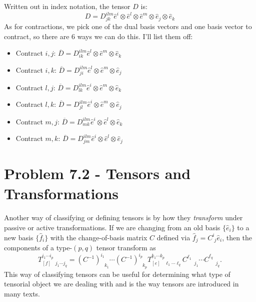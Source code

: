 \documentclass{article}
\newcommand{\pascovar}[2]{C^{#1}_{\phantom{#1}#2}}					%
\newcommand{\pascontra}[2]{(C^{-1})^{#1}_{\phantom{#1}#2}}				%
\begin{document}
\begin{solution}
	Written out in index notation, the tensor $D$ is:
	\[
		D = D^{ilm}_{jk} \hat{e}^i \otimes \hat{e}^l \otimes \hat{e}^m \otimes \hat{e}_j \otimes \hat{e}_k
	\] 
	As for contractions, we pick one of the dual basis vectors and one basis vector to contract, so there are 
	6 ways we can do this. I'll list them off:
	\begin{itemize}
		\item Contract $i, j$: $\overline D = D^{ilm}_{ik} \hat{e}^l \otimes \hat{e}^m \otimes \hat{e}_k$
		\item Contract $i, k$: $\overline D = D^{ilm}_{ji} \hat{e}^l \otimes \hat{e}^m \otimes \hat{e}_j$
		\item Contract $l, j$: $\overline D = D^{ilm}_{lk} \hat{e}^i \otimes \hat{e}^m \otimes \hat{e}_k$
		\item Contract $l, k$: $\overline D = D^{ilm}_{jl} \hat{e}^i \otimes \hat{e}^m \otimes \hat{e}_j $
		\item Contract $m, j$: $\overline D = D^{ilm}_{m k} \hat{e}^i \otimes \hat{e}^l \otimes \hat{e}_k$
		\item Contract $m, k$: $\overline D = D^{ilm}_{jm} \hat{e}^i \otimes \hat{e}^l \otimes \hat{e}_j$
	\end{itemize}
\end{solution}
\bigskip
\dphline
\pagebreak
\section*{Problem 7.2 - Tensors and Transformations}

\paragraph{}
Another way of classifying or defining tensors is by how they \emph{transform} under passive or active transformations.  If we are changing from an old basis $\{\hat{e}_{i}\}$
to a new basis $\{\hat{f}_{i}\}$ with the change-of-basis matrix $C$ defined via $\hat{f}_{j} = \pascovar{i}{j}\hat{e}_{i}$, then the components of a type-$(p,q)$ 
tensor transform as
	\begin{equation*}
		T^{i_{1}\cdots i_{p}}_{[f]\ \ \ \ j_{1}\cdots j_{q}}
		= 
		\pascontra{i_{1}}{k_{1}}\cdots\pascontra{i_{p}}{k_{p}}
		T^{k_{1}\cdots k_{p}}_{[e]\ \ \ \ \ell_{1}\cdots \ell_{q}}
		\pascovar{\ell_{1}}{j_{1}}\cdots \pascovar{\ell_{q}}{j_{q}}.
	\end{equation*}
This way of classifying tensors can be useful for determining what type of tensorial object we are dealing with and is the way tensors are introduced in many texts.
	
\end{document}

